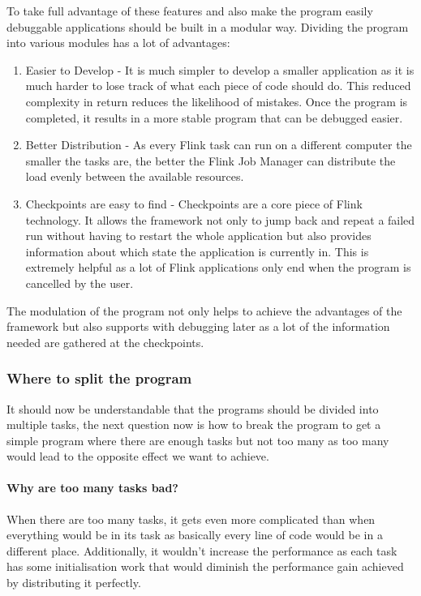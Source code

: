 To take full advantage of these features and also make the program easily debuggable applications should be built in a modular way. Dividing the program into various modules has a lot of advantages:
\begin{enumerate}
  \item Easier to Develop - It is much simpler to develop a smaller application as it is much harder to lose track of what each piece of code should do. This reduced complexity in return reduces the likelihood of mistakes. Once the program is completed, it results in a more stable program that can be debugged easier.
  \item Better Distribution -  As every Flink task can run on a different computer the smaller the tasks are, the better the Flink Job Manager can distribute the load evenly between the available resources.
  \item Checkpoints are easy to find - Checkpoints are a core piece of Flink technology. It allows the framework not only to jump back and repeat a failed run without having to restart the whole application but also provides information about which state the application is currently in. This is extremely helpful as a lot of Flink applications only end when the program is cancelled by the user.
\end{enumerate}

The modulation of the program not only helps to achieve the advantages of the framework but also supports with debugging later as a lot of the information needed are gathered at the checkpoints.

\subsubsection{Where to split the program}
It should now be understandable that the programs should be divided into multiple tasks, the next question now is how to break the program to get a simple program where there are enough tasks but not too many as too many would lead to the opposite effect we want to achieve.

\paragraph{Why are too many tasks bad?} When there are too many tasks, it gets even more complicated than when everything would be in its task as basically every line of code would be in a different place. Additionally, it wouldn't increase the performance as each task has some initialisation work that would diminish the performance gain achieved by distributing it perfectly.


